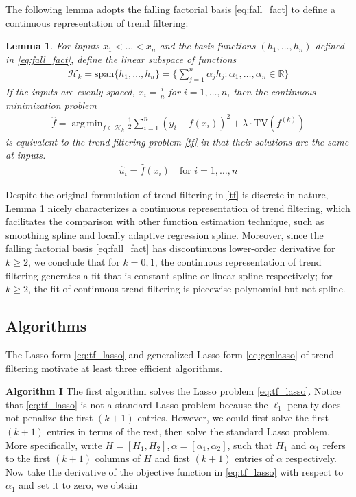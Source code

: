 \documentclass[a4paper]{article}
\DeclareMathOperator*{\argmin}{arg\,min}
\newtheorem{lemma}[theorem]{Lemma}
\newcommand{\RR}{\mathbb{R}}
\renewcommand{\cal}{\mathcal}
\begin{document}
The following lemma adopts the falling factorial basis \eqref{eq:fall_fact} to define a continuous representation of trend filtering:
\begin{lemma}
For inputs $x_1<\ldots<x_n$ and the basis functions $(h_1,\ldots, h_n)$ defined in \eqref{eq:fall_fact}, define the linear subspace of functions
\begin{align}
\cal{H}_k = \text{span}\{h_1,\ldots, h_n\} = \Big\{\sum_{j=1}^n \alpha_jh_j:\alpha_1,\ldots, \alpha_n\in\RR\Big\}
\end{align}
If the inputs are evenly-spaced, $x_i=\frac{i}{n}$ for $i=1,\ldots, n$, then the continuous minimization problem
\begin{align}
\hat{f} = \argmin_{f\in\cal{H}_k} \frac{1}{2}\sum_{i=1}^n(y_i-f(x_i))^2 + \lambda\cdot\text{TV}(f^{(k)})
\end{align}
is equivalent to the trend filtering problem \eqref{tf} in that their solutions are the same at inputs.
\begin{align*}
\hat{u}_i = \hat{f}(x_i) \quad \text{for } i=1,\ldots,n  
\end{align*}
\label{lemma:cont}
\end{lemma}

Despite the original formulation of trend filtering in \eqref{tf} is discrete in nature, Lemma \ref{lemma:cont} nicely characterizes a continuous representation of trend filtering, which facilitates the comparison with other function estimation technique, such as smoothing spline and locally adaptive regression spline. Moreover, since the falling factorial basis \eqref{eq:fall_fact} has discontinuous lower-order derivative for $k\geq 2$, we conclude that for $k = 0,1$, the continuous representation of trend filtering generates a fit that is constant spline or linear spline respectively; for $k\geq 2$, the fit of continuous trend filtering is piecewise polynomial but not spline.

\subsection{Algorithms}
\label{subsec:algo}
The Lasso form \eqref{eq:tf_lasso} and generalized Lasso form \eqref{eq:genlasso} of trend filtering motivate at least three efficient algorithms. 

\textbf{Algorithm I} The first algorithm solves the Lasso problem \eqref{eq:tf_lasso}. Notice that \eqref{eq:tf_lasso} is not a standard Lasso problem because the $\ell_1$ penalty does not penalize the first $(k+1)$ entries. However, we could first solve the first $(k+1)$ entries in terms of the rest, then solve the standard Lasso problem. More specifically, write $H = [H_1,H_2], \alpha = [\alpha_1, \alpha_2]$, such that $H_1$ and $\alpha_1$ refers to the first $(k+1)$ columns of $H$ and first $(k+1)$ entries of $\alpha$ respectively. Now take the derivative of the objective function in \eqref{eq:tf_lasso} with respect to $\alpha_1$ and set it to zero, we obtain
\end{document}
